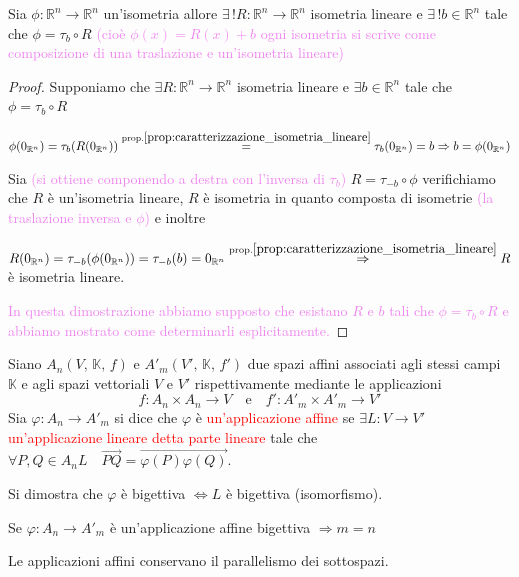         \begin{proposizione}
        \label{prop:caratterizzazione_isometria}
        Sia $\phi: \mathbb{R}^n \to \mathbb{R}^n$ un'isometria allore $\exists \, ! R: \mathbb{R}^n \to \mathbb{R}^n$ isometria lineare e
        $\exists \, ! b \in \mathbb{R}^n$ tale che $\phi = \tau_b \circ R$ \textcolor{violet}{(cioè $\phi(x) = R(x)+b$ ogni isometria si scrive come composizione
        di una traslazione e un'isometria lineare)}
        \end{proposizione}
        \begin{proof}
        Supponiamo che $\exists R: \mathbb{R}^n \to \mathbb{R}^n$ isometria lineare e $\exists b \in \mathbb{R}^n$ tale che $\phi = \tau_b \circ R$ 

        $\phi(0_{\mathbb{R}^n}) = \tau_b(R(0_{\mathbb{R}^n})) \overset{\text{prop.} \ref{prop:caratterizzazione_isometria_lineare}}{=} \tau_b(0_{\mathbb{R}^n}) = b \Rightarrow b = \phi(0_{\mathbb{R}^n})$
        
        Sia \textcolor{violet}{(si ottiene componendo a destra con l'inversa di $\tau_b$)} $R= \tau_{-b} \circ \phi$ verifichiamo 
        che $R$ è un'isometria lineare, $R$ è isometria in quanto composta di isometrie \textcolor{violet}{(la traslazione inversa e $\phi$)} e inoltre

        $R(0_{\mathbb{R}^n})= \tau_{-b}(\phi(0_{\mathbb{R}^n})) = \tau_{-b}(b) = 0_{\mathbb{R}^n} \overset{\text{prop.} \ref{prop:caratterizzazione_isometria_lineare}}{\Rightarrow} R$ è isometria lineare.
        
        \textcolor{violet}{In questa dimostrazione abbiamo supposto che esistano $R$ e $b$ tali che $\phi = \tau_b \circ R$ e abbiamo mostrato come determinarli esplicitamente.}
        \end{proof}
        \begin{richiamo}
        Siano $A_n\left(V, \, \mathbb{K}, \,f \right)$ e $A'_m\left(V', \, \mathbb{K}, \,f' \right)$ due spazi affini associati agli stessi campi $\mathbb{K}$ e
        agli spazi vettoriali $V$ e $V'$ rispettivamente mediante le applicazioni
        \[ f: A_n \times A_n \to V \quad \text{e} \quad f': A'_m \times A'_m \to V' \]
        Sia $\varphi: A_n \to A'_m$ si dice che $\varphi$ è \textcolor{red}{un'applicazione affine} se $\exists L: V \to V'$ 
        \textcolor{red}{un'applicazione lineare detta parte lineare} 
        tale che $\forall P, Q \in A_n L \quad \overrightarrow{PQ} = \overrightarrow{\varphi(P)\varphi(Q)}$.

        Si dimostra che $\varphi$ è \textcolor{celeste}{bigettiva} $\iff L$ è \textcolor{celeste}{bigettiva}  \textcolor{celeste}{(isomorfismo)}.

        Se $\varphi \colon A_n \to A'_m$ è un'applicazione affine \textcolor{celeste}{bigettiva} $\Rightarrow m=n$ 

        Le applicazioni affini conservano il parallelismo dei sottospazi.
        \end{richiamo}
